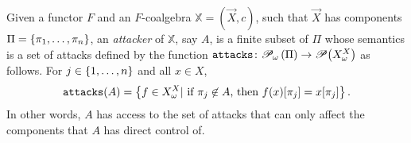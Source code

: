 \begin{definition}[Attacker]
Given a functor $F$ and an $F$-coalgebra $\mathbb{X}=(\vec{X},c)$, such that $\vec{X}$ has components $\Pi=\left\{\pi_1, \ldots, \pi_n\right\}$, an \emph{attacker} of $\mathbb{X}$, say $A$, is a {finite} subset of $\Pi$ whose semantics is a set of attacks defined by the function $\texttt{attacks}\colon {{{\mathscr{P}}_\omega}\left(\Pi\right)}\rightarrow{{\mathscr{P}}\!\left({X^X_\omega}\right)}$ as follows. 
For $j\in \left\{1, \ldots,  n\right\}$ and all $x\in X$,
\begin{align}
\texttt{attacks}(A)=\left\{f\in X^X_\omega | \text{ if $\pi_j \not\in A$, then $f(x)[\pi_j]=x[\pi_j]$}\right\}.
\end{align}
In other words, $A$ has access to the set of attacks that can only affect the components that $A$ has direct control of.
 \end{definition}
% 
%
